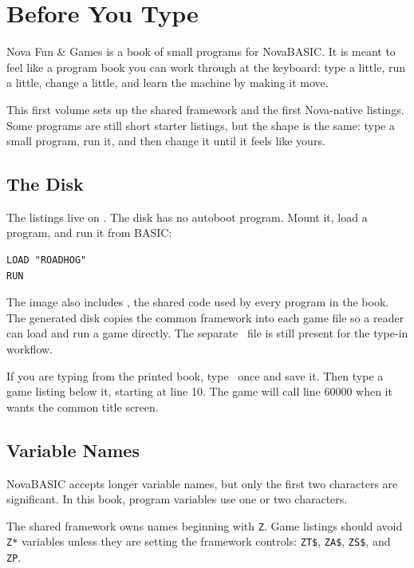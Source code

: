 \chapter{Before You Type}

Nova Fun \& Games is a book of small programs for NovaBASIC. It is meant to
feel like a program book you can work through at the keyboard: type a little,
run a little, change a little, and learn the machine by making it move.

This first volume sets up the shared framework and the first Nova-native
listings. Some programs are still short starter listings, but the shape is the
same: type a small program, run it, and then change it until it feels like
yours.

\section{The Disk}

The listings live on \diskname. The disk has no autoboot program. Mount it,
load a program, and run it from BASIC:

\begin{lstlisting}
LOAD "ROADHOG"
RUN
\end{lstlisting}

The image also includes \commonlisting, the shared code used by every program
in the book. The generated disk copies the common framework into each game file
so a reader can load and run a game directly. The separate \commonlisting\ file
is still present for the type-in workflow.

\begin{typeinbox}
If you are typing from the printed book, type \commonlisting\ once and save it.
Then type a game listing below it, starting at line 10. The game will call
line 60000 when it wants the common title screen.
\end{typeinbox}

\section{Variable Names}

NovaBASIC accepts longer variable names, but only the first two characters are
significant. In this book, program variables use one or two characters.

The shared framework owns names beginning with \texttt{Z}. Game listings should
avoid \texttt{Z*} variables unless they are setting the framework controls:
\texttt{ZT\$}, \texttt{ZA\$}, \texttt{ZS\$}, and \texttt{ZP}.

